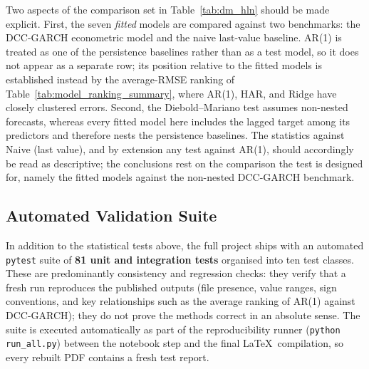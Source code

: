 Two aspects of the comparison set in Table~\ref{tab:dm_hln} should be made explicit.
First, the seven \emph{fitted} models are compared against two benchmarks: the DCC-GARCH
econometric model and the naive last-value baseline. AR(1) is treated as one of the
persistence baselines rather than as a test model, so it does not appear as a separate
row; its position relative to the fitted models is established instead by the
average-RMSE ranking of Table~\ref{tab:model_ranking_summary}, where AR(1), HAR, and
Ridge have closely clustered errors. Second, the Diebold--Mariano test assumes
non-nested forecasts, whereas every fitted model here includes the lagged target among
its predictors and therefore nests the persistence baselines. The statistics against
Naive (last value), and by extension any test against AR(1), should accordingly be read as
descriptive; the conclusions rest on the comparison the test is designed for, namely the
fitted models against the non-nested DCC-GARCH benchmark.

\subsection{Automated Validation Suite}
\label{subsec:auto_tests}

In addition to the statistical tests above, the full project ships with an
automated \texttt{pytest} suite of \textbf{81 unit and integration tests}
organised into ten test classes. These are predominantly consistency and regression
checks: they verify that a fresh run reproduces the published outputs (file presence,
value ranges, sign conventions, and key relationships such as the average ranking of
AR(1) against DCC-GARCH); they do not prove the methods correct in an absolute sense.
The suite is executed automatically as part of the reproducibility runner
(\texttt{python run\_all.py}) between the notebook step and the final
\LaTeX\ compilation, so every rebuilt PDF contains a fresh test report.

